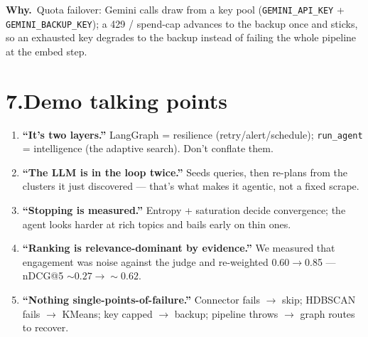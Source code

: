 \documentclass[11pt,a4paper]{article}
\newcommand{\why}[1]{%
  \par\vspace{2pt}%
  \noindent\colorbox{mist}{\begin{minipage}{\dimexpr\linewidth-2\fboxsep}%
  \textcolor{accent2}{\textbf{Why.}}~#1\end{minipage}}\par\vspace{3pt}}
\newcommand{\code}[1]{\texttt{\small #1}}
\begin{document}
\why{Quota failover: Gemini calls draw from a key pool
(\code{GEMINI\_API\_KEY} + \code{GEMINI\_BACKUP\_KEY}); a 429 / spend-cap
advances to the backup once and sticks, so an exhausted key degrades to the
backup instead of failing the whole pipeline at the embed step.}

\section*{7.\quad Demo talking points}

\begin{enumerate}[label=\textbf{\arabic*.}]
\item \textbf{``It's two layers.''} LangGraph = resilience (retry/alert/schedule);
\code{run\_agent} = intelligence (the adaptive search). Don't conflate them.
\item \textbf{``The LLM is in the loop twice.''} Seeds queries, then re-plans from
the clusters it just discovered --- that's what makes it agentic, not a fixed
scrape.
\item \textbf{``Stopping is measured.''} Entropy + saturation decide convergence;
the agent looks harder at rich topics and bails early on thin ones.
\item \textbf{``Ranking is relevance-dominant by evidence.''} We measured that
engagement was noise against the judge and re-weighted 0.60$\rightarrow$0.85 ---
nDCG@5 $\sim0.27\rightarrow\sim0.62$.
\item \textbf{``Nothing single-points-of-failure.''} Connector fails $\rightarrow$
skip; HDBSCAN fails $\rightarrow$ KMeans; key capped $\rightarrow$ backup; pipeline
throws $\rightarrow$ graph routes to recover.
\end{enumerate}
\end{document}
